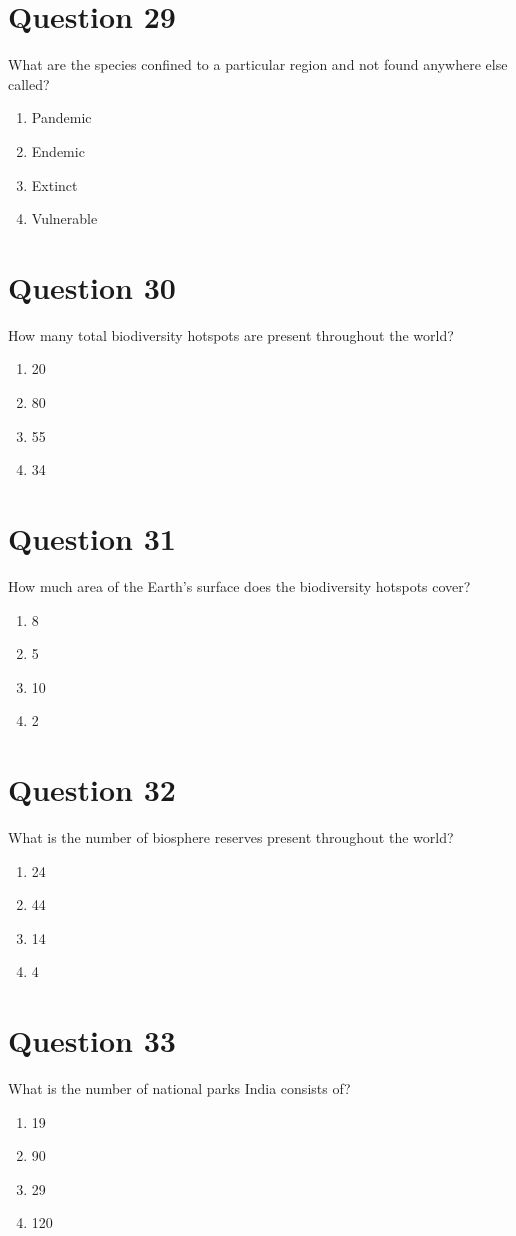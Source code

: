 \documentclass{article}
\begin{document}
\section*{Question 29}
What are the species confined to a particular region and not found anywhere else called?\newline
\begin{enumerate}[label=(\alph*)]
\item Pandemic
\item Endemic
\item Extinct
\item Vulnerable
\end{enumerate}
\newpage
\section*{Question 30}
How many total biodiversity hotspots are present throughout the world?
\begin{enumerate}[label=(\alph*)]
\item 20
\item 80
\item 55
\item 34
\end{enumerate}
\newpage
\section*{Question 31}
How much area of the Earth’s surface does the biodiversity hotspots cover?\newline
\begin{enumerate}[label=(\alph*)]
\item 8 %
\item 5 %
\item 10 %
\item 2 %
\end{enumerate}
\newpage
\section*{Question 32}
What is the number of biosphere reserves present throughout the world?\newline
\begin{enumerate}[label=(\alph*)]
\item 24
\item 44
\item 14
\item 4
\end{enumerate}
\newpage
\section*{Question 33}
What is the number of national parks India consists of?
\begin{enumerate}[label=(\alph*)]
\item 19
\item 90
\item 29
\item 120
\end{enumerate}
\newpage
\end{document}
